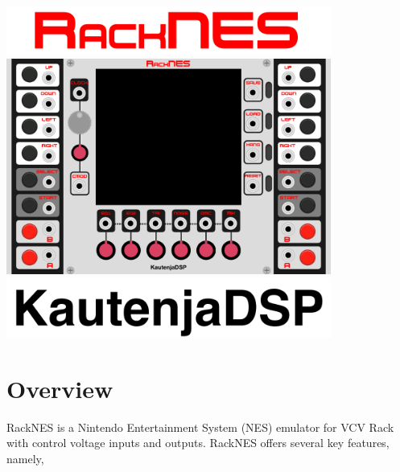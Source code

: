 \documentclass[12pt,a4paper]{article}
\begin{document}

\thispagestyle{empty}
\vspace*{\fill}
\begin{center}
\includegraphics[width=0.8\textwidth]{RackNES-Logo}
\linebreak\linebreak\linebreak\linebreak
\includegraphics[width=0.8\textwidth]{RackNES-Module}
\linebreak\linebreak\linebreak\linebreak
\includegraphics[width=0.8\textwidth]{KautenjaDSP}
\end{center}
\vspace*{\fill}
\clearpage


\section{Overview}

RackNES is a Nintendo Entertainment System (NES) emulator for VCV Rack with control voltage inputs and outputs. RackNES offers several key features, namely,
\end{document}
